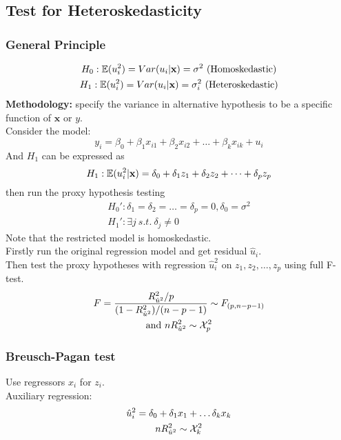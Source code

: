 \documentclass[]{article}
\begin{document}
		\subsection{Test for Heteroskedasticity}
		\subsubsection{General Principle}
			\begin{gather*}
				H_0: \mathbb{E}({u_i^2}) = Var(u_i|\textbf{x}) = \sigma^2 \text{{ (Homoskedastic)}} \\
				H_1: \mathbb{E}({u_i^2}) = Var(u_i|\textbf{x}) = \sigma_i^2 \text{{ (Heteroskedastic)}}
			\end{gather*}
			\textbf{Methodology:} specify the variance in alternative hypothesis to be a specific function of $\textbf{x}$ or $y$. \\
			Consider the model: 
			\[
				y_i = \beta_0 + \beta_1 x_{i1} + \beta_2 x_{i2} + \dots + \beta_k x_{ik} + u_i
			\]
			And $H_1$ can be expressed as 
			\[
				H_1: \mathbb{E}({u_i^2|\textbf{x}}) = \delta_0 + \delta_1 z_1 + \delta_2 z_2 + \dots + \delta_p z_p
			\]
			then run the proxy hypothesis testing
			\begin{gather*}
				H_0': \delta_1 = \delta_2 = \dots = \delta_p = 0, \delta_0 = \sigma^2 \\
				H_1': \exists j\ s.t.\ \delta_j \neq 0
			\end{gather*}
			Note that the restricted model is homoskedastic. \\
			Firstly run the original regression model and get residual $\hat{u}_i$. \\
			Then test the proxy hypotheses with regression $\hat{u}_i^2$ on $z_1, z_2, \dots, z_p$ using full F-test.
			\begin{gather*}
				F = \frac{R^2_{\hat{u}^2}/p}{(1-R^2_{\hat{u}^2})/(n-p-1)} \sim F_{(p, n-p-1)} \\
				 \text{{and }}n R^2_{\hat{u}^2} \sim \mathcal{{X}}_p^2
			\end{gather*}
			
			\subsubsection{Breusch-Pagan test}
				\par Use regressors $x_i$ for $z_i$. \\
				Auxiliary regression:
				\begin{gather*}
					\hat{u}_i^2 = \delta_0 + \delta_1 x_1 + \dots \delta_k x_k \\
					n R^2_{\hat{u}^2} \sim \mathcal{{X}}_k^2
				\end{gather*}
\end{document}
